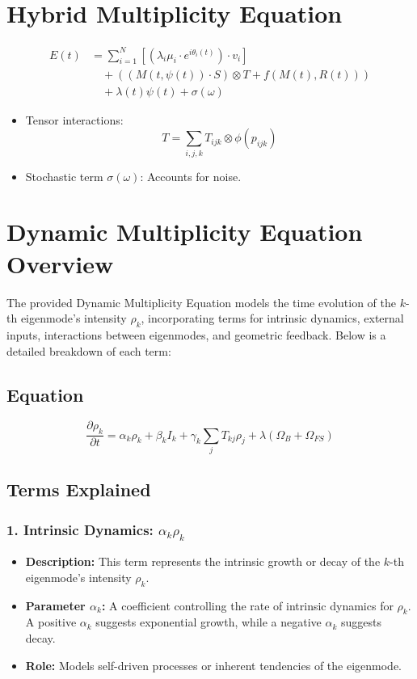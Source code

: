 \documentclass{article}
\theoremstyle{plain}
\begin{document}
\section{Hybrid Multiplicity Equation}
\begin{align}
E(t) &= \sum_{i=1}^N \left[ \left( \lambda_i \mu_i \cdot e^{i\theta_i(t)} \right) \cdot v_i \right] \nonumber \\
&\quad + \left( (M(t, \psi(t)) \cdot S) \otimes T + f(M(t), R(t)) \right) \nonumber \\
&\quad + \lambda(t)\psi(t) + \sigma(\omega)
\end{align}
\begin{itemize}
    \item Tensor interactions:
    \[
    T = \sum_{i,j,k} T_{ijk} \otimes \phi(p_{ijk})
    \]
    \item Stochastic term \( \sigma(\omega) \): Accounts for noise.
\end{itemize}

\section{Dynamic Multiplicity Equation Overview}

The provided Dynamic Multiplicity Equation models the time evolution of the \(k\)-th eigenmode’s intensity \(\rho_k\), incorporating terms for intrinsic dynamics, external inputs, interactions between eigenmodes, and geometric feedback. Below is a detailed breakdown of each term:

\subsection{Equation}
\begin{equation}
\frac{\partial \rho_k}{\partial t} = \alpha_k \rho_k + \beta_k I_k + \gamma_k \sum_j T_{kj} \rho_j + \lambda (\Omega_B + \Omega_{FS})
\end{equation}

\subsection{Terms Explained}

\subsubsection{1. Intrinsic Dynamics: \(\alpha_k \rho_k\)}
\begin{itemize}
    \item \textbf{Description:} This term represents the intrinsic growth or decay of the \(k\)-th eigenmode’s intensity \(\rho_k\).
    \item \textbf{Parameter \(\alpha_k\):} A coefficient controlling the rate of intrinsic dynamics for \(\rho_k\). A positive \(\alpha_k\) suggests exponential growth, while a negative \(\alpha_k\) suggests decay.
    \item \textbf{Role:} Models self-driven processes or inherent tendencies of the eigenmode.
\end{itemize}
\end{document}
